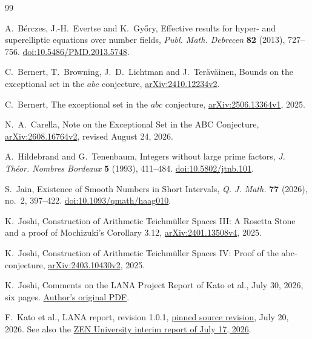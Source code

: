 \documentclass[11pt]{amsart}
\theoremstyle{definition}
\theoremstyle{remark}
\begin{document}
\begin{thebibliography}{99}

A.~B\'erczes, J.-H.~Evertse and K.~Gy\H{o}ry,
Effective results for hyper- and superelliptic equations over number fields,
\emph{Publ. Math. Debrecen} \textbf{82} (2013), 727--756.
\href{https://doi.org/10.5486/PMD.2013.5748}{doi:10.5486/PMD.2013.5748}.

C.~Bernert, T.~Browning, J.~D.~Lichtman and J.~Ter\"av\"ainen,
Bounds on the exceptional set in the $abc$ conjecture,
\href{https://arxiv.org/abs/2410.12234v2}{arXiv:2410.12234v2}.

C.~Bernert, The exceptional set in the $abc$ conjecture,
\href{https://arxiv.org/abs/2506.13364v1}{arXiv:2506.13364v1}, 2025.

N.~A.~Carella, Note on the Exceptional Set in the ABC Conjecture,
\href{https://arxiv.org/abs/2608.16764v2}{arXiv:2608.16764v2},
revised August 24, 2026.

A.~Hildebrand and G.~Tenenbaum, Integers without large prime factors,
\emph{J. Th\'eor. Nombres Bordeaux} \textbf{5} (1993), 411--484.
\href{https://doi.org/10.5802/jtnb.101}{doi:10.5802/jtnb.101}.

S.~Jain, Existence of Smooth Numbers in Short Intervals,
\emph{Q. J. Math.} \textbf{77} (2026), no.~2, 397--422.
\href{https://doi.org/10.1093/qmath/haag010}{doi:10.1093/qmath/haag010}.

K.~Joshi, Construction of Arithmetic Teichm\"uller Spaces III:
A Rosetta Stone and a proof of Mochizuki's Corollary 3.12,
\href{https://arxiv.org/abs/2401.13508v4}{arXiv:2401.13508v4}, 2025.

K.~Joshi, Construction of Arithmetic Teichm\"uller Spaces IV:
Proof of the abc-conjecture,
\href{https://arxiv.org/abs/2403.10430v2}{arXiv:2403.10430v2}, 2025.

K.~Joshi, Comments on the LANA Project Report of Kato et al.,
July 30, 2026, six pages.
\href{https://sites.arizona.edu/kirti-joshi/files/2026/07/Comments-on-the-LANA-Project-Report-of-Kato-et-al.pdf}{Author's original PDF}.

F.~Kato et al., LANA report, revision 1.0.1,
\href{https://github.com/katobungen/LANA_report_202607/tree/293bdd89463473ae13d40834d70fb4b7ba81da1f}{pinned source revision}, July 20, 2026.
See also the \href{https://zen.ac.jp/news/zmcpostevent0717e}{ZEN University
interim report of July 17, 2026}.


\end{thebibliography}
\end{document}
